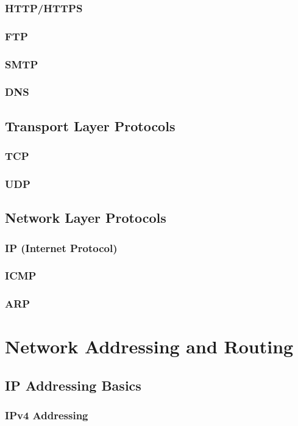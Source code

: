 \documentclass{book}
\begin{document}
        \subsection{HTTP/HTTPS}
        \subsection{FTP}
        \subsection{SMTP}
        \subsection{DNS}
    \section{Transport Layer Protocols}
        \subsection{TCP}
        \subsection{UDP}
    \section{Network Layer Protocols}
        \subsection{IP (Internet Protocol)}
        \subsection{ICMP}
        \subsection{ARP}
        
\chapter{Network Addressing and Routing}
    \section{IP Addressing Basics}
        \subsection{IPv4 Addressing}
\end{document}
